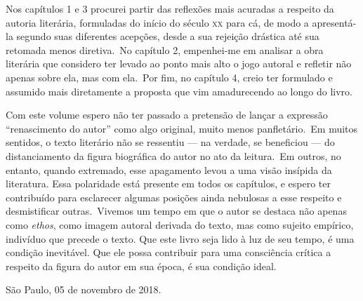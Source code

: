 Nos capítulos 1 e 3 procurei partir das reflexões mais acuradas a respeito da autoria literária, formuladas do início do século \textsc{xx} para cá, de modo a apresentá-la segundo suas diferentes acepções, desde a sua rejeição drástica até sua retomada menos diretiva.~No capítulo 2, empenhei-me em analisar a obra literária que considero ter levado ao ponto mais alto o jogo autoral e refletir não apenas sobre ela, mas com ela.~Por fim, no capítulo 4, creio ter formulado e assumido mais diretamente a proposta que vim amadurecendo ao longo do livro. 

Com este volume espero não ter passado a pretensão de lançar a expressão ``renascimento do autor'' como algo original, muito menos panfletário.~Em muitos sentidos, o texto literário não se ressentiu --- na verdade, se beneficiou --- do distanciamento da figura biográfica do autor no ato da leitura.~Em outros, no entanto, quando extremado, esse apagamento levou a uma visão insípida da literatura. Essa polaridade está presente em todos os capítulos, e espero ter contribuído para esclarecer algumas posições ainda nebulosas a esse respeito e desmistificar outras.~Vivemos um tempo em que o autor se destaca não apenas como \emph{ethos}, como imagem autoral derivada do texto, mas como sujeito empírico, indivíduo que precede o texto. Que este livro seja lido à luz de seu tempo, é uma condição inevitável. Que ele possa contribuir para uma consciência crítica a respeito da figura do autor em sua época, é sua condição ideal. 

\bigskip
\bigskip

\begin{flushright}
São Paulo, 05 de novembro de 2018.
\end{flushright}